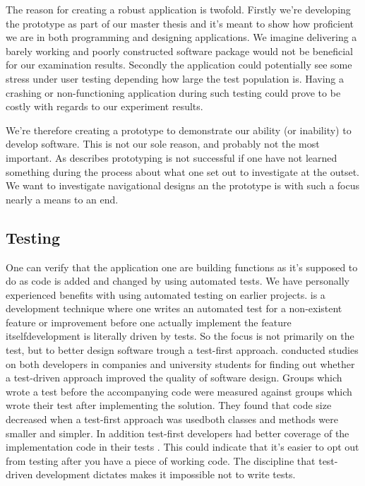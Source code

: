 The reason for creating a robust application is twofold. Firstly we're
developing
the prototype as part of our master thesis and it's meant to show how
proficient we are in both programming and designing applications. We
imagine delivering a barely working and poorly constructed software package
would not be beneficial for our examination results.
Secondly the application could potentially see some stress under user testing
depending how large the test population is. Having a crashing or
non-functioning application during such testing could prove to be costly with
regards to our experiment results.

We're therefore creating a prototype to demonstrate our ability (or inability)
to develop software. This is not our sole reason, and probably not the most
important. As \citet[]{mayhew90} describes prototyping is not
successful if one have not learned something during the process about what one
set out to investigate at the outset. We want to investigate navigational
designs an the prototype is with such a focus nearly a means to an end.

\subsection{Testing}
\label{section:implementation.process.testing}

One can verify that the application one are building functions as it's
supposed to do as code is added and changed by using automated tests.
We have personally experienced benefits with using automated testing on
earlier projects.
 is a development technique
where one writes an automated test for a non-existent feature or
improvement before one actually implement the feature itself\dash{}development
is literally driven by tests. So the focus is not primarily on the test, but
to better design software trough a test-first approach.
\citet{janzen08} conducted studies
on both developers in companies and university students for finding out
whether a test-driven approach improved the quality of software design.
Groups which wrote a test before the accompanying code were measured
against groups which wrote their test after implementing the solution.
They found that code size decreased when a test-first approach was
used\dash{}both classes and methods were smaller and simpler. In addition
test-first developers had better coverage of the implementation code in
their tests \citep[]{janzen08}. This could indicate that it's
easier to opt out from testing after you have a piece
of working code. The discipline that test-driven development dictates
makes it impossible not to write tests.

